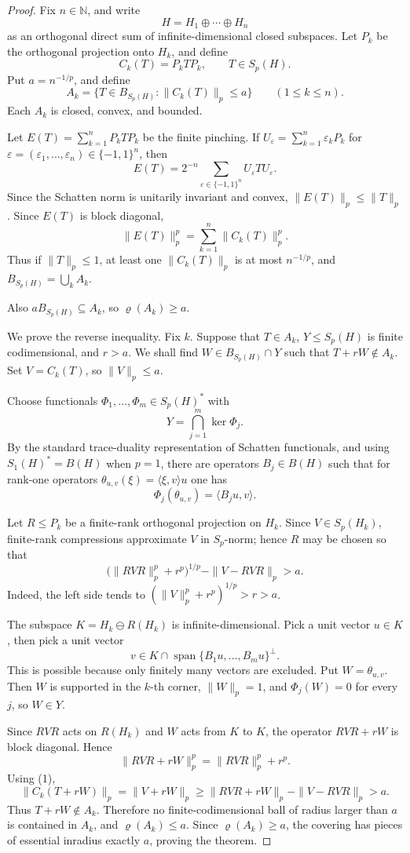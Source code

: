 \documentclass[11pt]{article}
\newcommand{\N}{\mathbb N}
\newcommand{\Span}{\operatorname{span}}
\begin{document}
\begin{proof}
Fix \(n\in\N\), and write
\[
  H=H_1\oplus\cdots\oplus H_n
\]
as an orthogonal direct sum of infinite-dimensional closed subspaces.  Let
\(P_k\) be the orthogonal projection onto \(H_k\), and define
\[
  C_k(T)=P_kTP_k,\qquad T\in S_p(H).
\]
Put \(a=n^{-1/p}\), and define
\[
  A_k=\{T\in B_{S_p(H)}:\|C_k(T)\|_p\le a\}\qquad(1\le k\le n).
\]
Each \(A_k\) is closed, convex, and bounded.

Let \(E(T)=\sum_{k=1}^n P_kTP_k\) be the finite pinching.  If
\(U_\varepsilon=\sum_{k=1}^n \varepsilon_k P_k\) for
\(\varepsilon=(\varepsilon_1,\dots,\varepsilon_n)\in\{-1,1\}^n\), then
\[
  E(T)=2^{-n}\sum_{\varepsilon\in\{-1,1\}^n}
  U_\varepsilon T U_\varepsilon .
\]
Since the Schatten norm is unitarily invariant and convex, \(\|E(T)\|_p\le
\|T\|_p\).  Since \(E(T)\) is block diagonal,
\[
  \|E(T)\|_p^p=\sum_{k=1}^n \|C_k(T)\|_p^p.
\]
Thus if \(\|T\|_p\le1\), at least one \(\|C_k(T)\|_p\) is at most
\(n^{-1/p}\), and \(B_{S_p(H)}=\bigcup_k A_k\).

Also \(aB_{S_p(H)}\subseteq A_k\), so \(\varrho(A_k)\ge a\).

We prove the reverse inequality.  Fix \(k\).  Suppose that
\(T\in A_k\), \(Y\le S_p(H)\) is finite codimensional, and \(r>a\).  We shall
find \(W\in B_{S_p(H)}\cap Y\) such that \(T+rW\notin A_k\).  Set
\(V=C_k(T)\), so \(\|V\|_p\le a\).

Choose functionals \(\Phi_1,\dots,\Phi_m\in S_p(H)^*\) with
\[
  Y=\bigcap_{j=1}^m \ker \Phi_j.
\]
By the standard trace-duality representation of Schatten functionals, and
using \(S_1(H)^*=B(H)\) when \(p=1\), there are operators \(B_j\in B(H)\) such
that for rank-one operators
\(\theta_{u,v}(\xi)=\langle \xi,v\rangle u\) one has
\[
  \Phi_j(\theta_{u,v})=\langle B_j u,v\rangle .
\]

Let \(R\le P_k\) be a finite-rank orthogonal projection on \(H_k\).  Since
\(V\in S_p(H_k)\), finite-rank compressions approximate \(V\) in \(S_p\)-norm;
hence \(R\) may be chosen so that
\[
  \bigl(\|RVR\|_p^p+r^p\bigr)^{1/p}
  -\|V-RVR\|_p
  > a. \tag{1}
\]
Indeed, the left side tends to \((\|V\|_p^p+r^p)^{1/p}>r>a\).

The subspace \(K=H_k\ominus R(H_k)\) is infinite-dimensional.  Pick a unit
vector \(u\in K\), then pick a unit vector
\[
  v\in K\cap \Span\{B_1u,\dots,B_mu\}^{\perp}.
\]
This is possible because only finitely many vectors are excluded.  Put
\(W=\theta_{u,v}\).  Then \(W\) is supported in the \(k\)-th corner,
\(\|W\|_p=1\), and \(\Phi_j(W)=0\) for every \(j\), so \(W\in Y\).

Since \(RVR\) acts on \(R(H_k)\) and \(W\) acts from \(K\) to \(K\), the
operator \(RVR+rW\) is block diagonal.  Hence
\[
  \|RVR+rW\|_p^p=\|RVR\|_p^p+r^p.
\]
Using (1),
\[
  \|C_k(T+rW)\|_p
  =\|V+rW\|_p
  \ge \|RVR+rW\|_p-\|V-RVR\|_p
  >a.
\]
Thus \(T+rW\notin A_k\).  Therefore no finite-codimensional ball of radius
larger than \(a\) is contained in \(A_k\), and \(\varrho(A_k)\le a\).  Since
\(\varrho(A_k)\ge a\), the covering has pieces of essential inradius exactly
\(a\), proving the theorem.
\end{proof}
\end{document}

